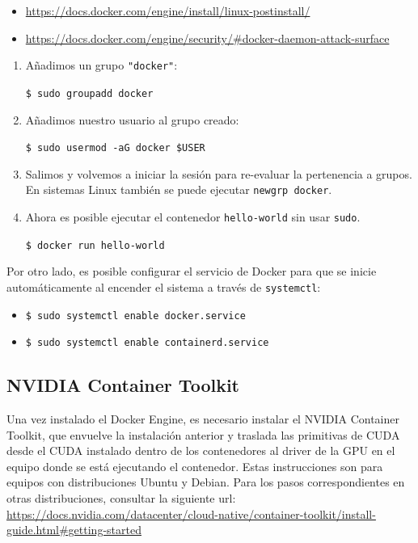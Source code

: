 \begin{itemize}

\item \url{https://docs.docker.com/engine/install/linux-postinstall/}

\item \url{https://docs.docker.com/engine/security/#docker-daemon-attack-surface}

\end{itemize}


\begin{enumerate}

\item Añadimos un grupo \texttt{"docker"}:

\texttt{\$ sudo groupadd docker}

\item Añadimos nuestro usuario al grupo creado:

\texttt{\$ sudo usermod -aG docker \$USER}

\item Salimos y volvemos a iniciar la sesión para re-evaluar la pertenencia a grupos. En sistemas Linux también se puede ejecutar \texttt{newgrp docker}. 

\item Ahora es posible ejecutar el contenedor \texttt{hello-world} sin usar \texttt{sudo}.

\texttt{\$ docker run hello-world}


\end{enumerate}

Por otro lado, es posible configurar el servicio de Docker para que se inicie automáticamente al encender el sistema a través de \texttt{systemctl}:

\begin{itemize}

\item \texttt{\$ sudo systemctl enable docker.service}

\item \texttt{\$ sudo systemctl enable containerd.service}

\end{itemize}

\subsection{NVIDIA Container Toolkit}
Una vez instalado el Docker Engine, es necesario instalar el NVIDIA Container Toolkit, que envuelve la instalación anterior y traslada las primitivas de CUDA desde el CUDA instalado dentro de los contenedores al driver de la GPU en el equipo donde se está ejecutando el contenedor. Estas instrucciones son para equipos con distribuciones Ubuntu y Debian. Para los pasos correspondientes en otras distribuciones, consultar la siguiente url: \url{https://docs.nvidia.com/datacenter/cloud-native/container-toolkit/install-guide.html#getting-started}

